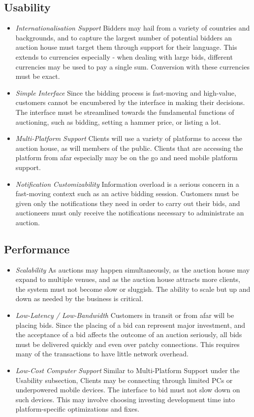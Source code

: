 \documentclass[titlepage, 12pt]{extarticle}
\begin{document}
\subsection{Usability}
\begin{itemize}
\item {\it Internationalisation Support} Bidders may hail from a variety of countries and backgrounds, and to capture the largest number of potential bidders an auction house must target them through support for their language. This extends to currencies especially - when dealing with large bids, different currencies may be used to pay a single sum. Conversion with these currencies must be exact.
\item {\it Simple Interface} Since the bidding process is fast-moving and high-value, customers cannot be encumbered by the interface in making their decisions. The interface must be streamlined towards the fundamental functions of auctioning, such as bidding, setting a hammer price, or listing a lot.
\item {\it Multi-Platform Support} Clients will use a variety of platforms to access the auction house, as will members of the public. Clients that are accessing the platform from afar especially may be on the go and need mobile platform support.
\item {\it Notification Customizability} Information overload is a serious concern in a fast-moving context such as an active bidding session. Customers must be given only the notifications they need in order to carry out their bids, and auctioneers must only receive the notifications necessary to administrate an auction.
\end{itemize}
\subsection{Performance}
\begin{itemize}
\item {\it Scalability} As auctions may happen simultaneously, as the auction house may expand to multiple venues, and as the auction house attracts more clients, the system must not become slow or sluggish. The ability to scale but up and down as needed by the business is critical.
\item {\it Low-Latency / Low-Bandwidth} Customers in transit or from afar will be placing bids. Since the placing of a bid can represent major investment, and the acceptance of a bid affects the outcome of an auction seriously, all bids must be delivered quickly and even over patchy connections. This requires many of the transactions to have little network overhead.
\item {\it Low-Cost Computer Support} Similar to Multi-Platform Support under the Usability subsection, Clients may be connecting through limited PCs or underpowered mobile devices. The interface to bid must not slow down on such devices. This may involve choosing investing development time into platform-specific optimizations and fixes.
\end{itemize}
\end{document}

